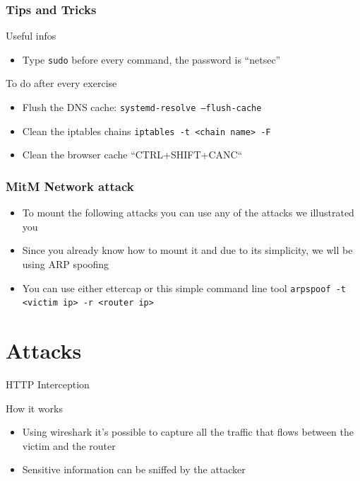 \documentclass{beamer}
\begin{document}
\begin{frame}
\frametitle{Tips and Tricks}

\begin{block}{Useful infos}
  \begin{itemize}
    \item Type \texttt{sudo} before every command, the password  is ``netsec''
  \end{itemize}
\end{block}
\begin{block}{To do after every exercise}
\begin{itemize}
  \item Flush the DNS cache: \texttt{systemd-resolve --flush-cache}
  \item Clean the iptables chains \texttt{iptables -t <chain name> -F}
  \item Clean the browser cache ``CTRL+SHIFT+CANC``
\end{itemize}
\end{block}

\end{frame}



\begin{frame}[fragile]
\frametitle{MitM Network attack}
\begin{block}{}
  \begin{itemize}
    \item To mount the following attacks you can use any of the attacks we illustrated you
    \item Since you already know how to mount it and due to its simplicity, we wll be using ARP spoofing
  \end{itemize}
\end{block}

\begin{block}{}
  \begin{itemize}
    \item You can use either ettercap or this simple command line tool
    \texttt{arpspoof -t <victim ip> -r <router ip>}
  \end{itemize}
\end{block}
\end{frame}


\section{Attacks}
\begin{frame}{HTTP Interception}
  \begin{block}{How it works}
    \begin{itemize}
      \item Using wireshark it's possible to capture all the traffic that flows between the victim and the router
      \item Sensitive information can be sniffed by the attacker
    \end{itemize}
  \end{block}
\end{frame}
\end{document}
